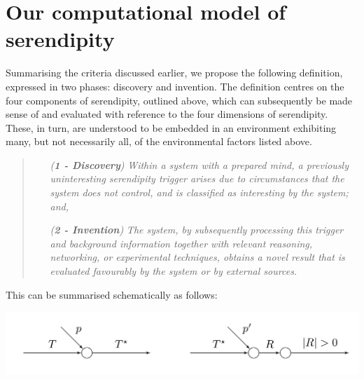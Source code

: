 \section{Our computational model of serendipity} \label{sec:background}

Summarising the criteria discussed earlier, we propose the following
definition, expressed in two phases: discovery and invention.  The
definition centres on the four components of serendipity, outlined
above, which can subsequently be made sense of and evaluated with
reference to the four dimensions of serendipity.  These, in turn, are
understood to be embedded in an environment exhibiting many, but not
necessarily all, of the environmental factors listed above.

\begin{quote}
\begin{enumerate}[itemsep=2pt,labelwidth=9em,leftmargin=6em,rightmargin=2em]
\item[\emph{(\textbf{1 - Discovery})}] \emph{Within a system with a prepared mind, a previously uninteresting serendipity trigger arises due to circumstances that the system does not control, and is classified as interesting by the system; and,}
\item[\emph{(\textbf{2 - Invention})}] \emph{The system, by subsequently processing this trigger and background information together with relevant reasoning, networking, or experimental techniques, obtains a novel result that is evaluated favourably by the system or by external sources.}
\end{enumerate}
\end{quote}

This can be summarised schematically as follows:

% 
{\centering
\includegraphics[width=.8\textwidth]{schematic}
\par}

